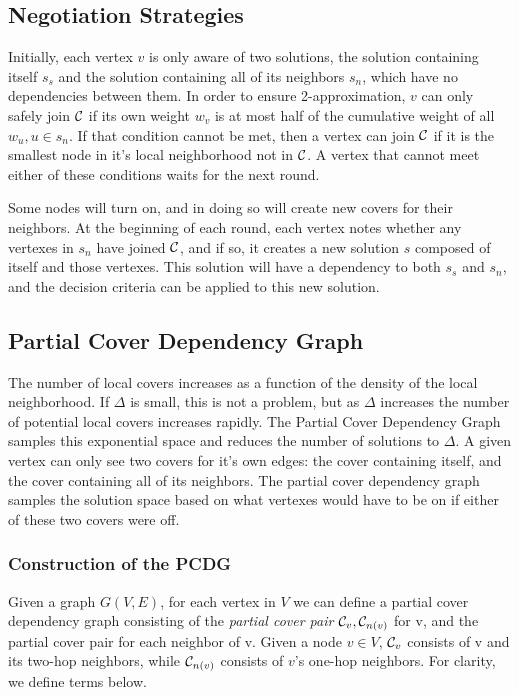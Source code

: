 \subsection{Negotiation Strategies}
Initially, each vertex $v$ is only aware of two solutions, the solution containing itself $s_s$ and the solution containing all of its neighbors $s_n$, which have no dependencies between them. In order to ensure 2-approximation, $v$ can only safely join ${\mathcal C}$ if its own weight $w_v$ is at most half of the cumulative weight of all $w_u, u \in s_n $. If that condition cannot be met, then a vertex can join ${\mathcal C}$ if it is the smallest node in it's local neighborhood not in ${\mathcal C}$. A vertex that cannot meet either of these conditions waits for the next round. 

Some nodes will turn on, and in doing so will create new covers for their neighbors. At the beginning of each round, each vertex notes whether any vertexes in $s_n$ have joined ${\mathcal C}$, and if so, it creates a new solution $s$ composed of itself and those vertexes. This solution will have a dependency to both $s_s$ and $s_n$, and the decision criteria can be applied to this new solution. 

\subsection{Partial Cover Dependency Graph}

The number of local covers increases as a function of the density of the local neighborhood. If $\Delta$ is small, this is not a problem, but as $\Delta$ increases the number of potential local covers increases rapidly. The Partial Cover Dependency Graph samples this exponential space and reduces the number of solutions to $\Delta$. A given vertex can only see two covers for it's own edges: the cover containing itself, and the cover containing all of its neighbors. The partial cover dependency graph samples the solution space based on what vertexes would have to be on if either of these two covers were off. 

\subsubsection{Construction of the PCDG}

Given a graph $G(V,E)$, for each vertex in $V$ we can define a partial cover dependency graph consisting of the {\em partial cover pair} ${\mathcal C}_v, {\mathcal C}_{n(v)}$ for v, and the partial cover pair for each neighbor of v. Given a node $v \in V$, ${\mathcal C}_v$ consists of v and its two-hop neighbors, while ${\mathcal C}_{n(v)}$ consists of $v$'s one-hop neighbors. For clarity, we define terms below.


